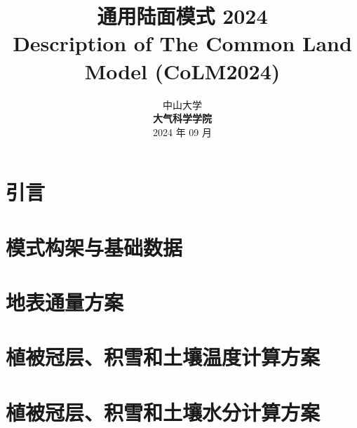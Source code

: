 \documentclass[a4paper,12pt,twoside]{report}
\begin{document}
%

\title{\huge {\bf 通用陆面模式 2024}\\[3em]
\fontsize {22}{24}
\bf{ Description of The Common Land Model (CoLM2024)}\\[3in]
\fontsize {20}{23}%
}

\author{%
 \large{ 中山大学 }\\[0.1in]
 {\bf 大气科学学院}\\[1in]
 \upshape
 \large%
2024 年 09 月%
}

\maketitle
\preface
%
%
%
%

\body
\part{引言}


\part{模式构架与基础数据}



\part{地表通量方案}\label{part:flux}






\part{植被冠层、积雪和土壤温度计算方案}\label{part:temp}



\part{植被冠层、积雪和土壤水分计算方案}\label{part:SPC}



\end{document}
